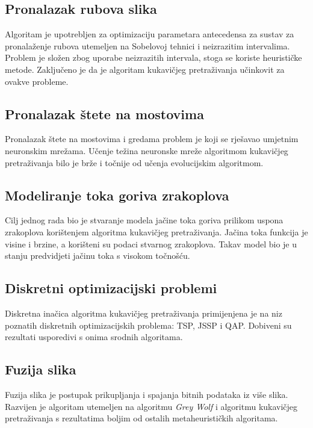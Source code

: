 \subsection{Pronalazak rubova slika}
\hspace{\parindent} Algoritam je upotrebljen za optimizaciju parametara antecedensa za sustav za pronalaženje rubova utemeljen na Sobelovoj tehnici i neizrazitim intervalima.\cite{7256924} Problem je složen zbog uporabe neizrazitih intervala, stoga se koriste heurističke metode. Zaključeno je da je algoritam kukavičjeg pretraživanja učinkovit za ovakve probleme.

\subsection{Pronalazak štete na mostovima}
\hspace{\parindent} Pronalazak štete na mostovima i gredama problem je koji se rješavao umjetnim neuronskim mrežama.\cite{TRANNGOC2019109637} Učenje težina neuronske mreže algoritmom kukavičjeg pretraživanja bilo je brže i točnije od učenja evolucijskim algoritmom.

\subsection{Modeliranje toka goriva zrakoplova}
\hspace{\parindent} Cilj jednog rada bio je stvaranje modela jačine toka goriva prilikom uspona zrakoplova korištenjem algoritma kukavičjeg pretraživanja.\cite{oruc2020} Jačina toka funkcija je visine i brzine, a korišteni su podaci stvarnog zrakoplova. Takav model bio je u stanju predvidjeti jačinu toka s visokom točnošću. 



\subsection{Diskretni optimizacijski problemi}
\hspace{\parindent} Diskretna inačica algoritma kukavičjeg pretraživanja primijenjena je na niz poznatih diskretnih optimizacijskih problema: TSP, JSSP i QAP.\cite{Ouaarab2020} Dobiveni su rezultati usporedivi s onima srodnih algoritama. 


\subsection{Fuzija slika}
\hspace{\parindent} Fuzija slika je postupak prikupljanja i spajanja bitnih podataka iz više slika. Razvijen je algoritam utemeljen na algoritmu \textit{Grey Wolf} i algoritmu kukavičjeg pretraživanja s rezultatima boljim od ostalih metaheurističkih algoritama.\cite{dutta2020}
